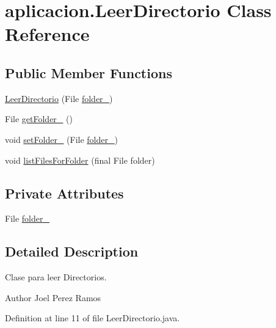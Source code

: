 \hypertarget{classaplicacion_1_1_leer_directorio}{}\section{aplicacion.\+Leer\+Directorio Class Reference}
\label{classaplicacion_1_1_leer_directorio}
\subsection*{Public Member Functions}
\begin{DoxyCompactItemize}
\item 
\hyperlink{classaplicacion_1_1_leer_directorio_a02169b5b69017ed66a63b94f9bd7a2ad}{Leer\+Directorio} (File \hyperlink{classaplicacion_1_1_leer_directorio_a031199bdbe2aad57413386f22a4bc81d}{folder\+\_\+})
\item 
File \hyperlink{classaplicacion_1_1_leer_directorio_aa9db3677912609ea74f9b21c654c6ad8}{get\+Folder\+\_\+} ()
\item 
void \hyperlink{classaplicacion_1_1_leer_directorio_a42152251cb0eaf44b59e8ea92ebcc165}{set\+Folder\+\_\+} (File \hyperlink{classaplicacion_1_1_leer_directorio_a031199bdbe2aad57413386f22a4bc81d}{folder\+\_\+})
\item 
void \hyperlink{classaplicacion_1_1_leer_directorio_a59321b6374b5ef72ac862f6b283399c9}{list\+Files\+For\+Folder} (final File folder)
\end{DoxyCompactItemize}
\subsection*{Private Attributes}
\begin{DoxyCompactItemize}
\item 
File \hyperlink{classaplicacion_1_1_leer_directorio_a031199bdbe2aad57413386f22a4bc81d}{folder\+\_\+}
\end{DoxyCompactItemize}


\subsection{Detailed Description}
Clase para leer Directorios. \begin{DoxyAuthor}{Author}
Joel Perez Ramos 
\end{DoxyAuthor}


Definition at line 11 of file Leer\+Directorio.\+java.



